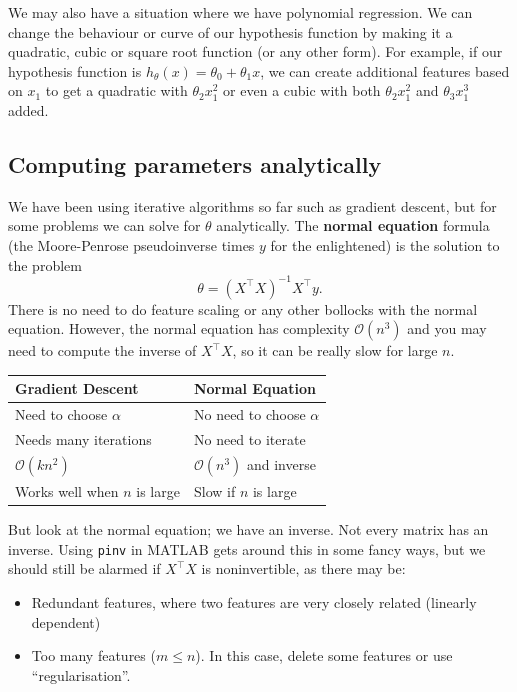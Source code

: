 \documentclass[a4paper, 12pt, oneside]{scrartcl}
\begin{document}
We may also have a situation where we have polynomial regression. We can change the behaviour or curve of our hypothesis function by making it a quadratic, cubic or square root function (or any other form). For example, if our hypothesis function is $h_\theta(x) = \theta_0 + \theta_1 x$, we can create additional features based on $x_1$ to get a quadratic with $\theta_2 x_1^2$ or even a cubic with both $\theta_2 x_1^2$ and $\theta_3 x_1^3$ added.

\subsection{Computing parameters analytically}

We have been using iterative algorithms so far such as gradient descent, but for some problems we can solve for $\theta$ analytically. The \textbf{normal equation} formula (the Moore-Penrose pseudoinverse times $y$ for the enlightened) is the solution to the problem
\[\theta = (X^\top X)^{-1} X^\top y.\]
There is no need to do feature scaling or any other bollocks with the normal equation. However, the normal equation has complexity $\mathcal O(n^3)$ and you may need to compute the inverse of $X^\top X$, so it can be really slow for large $n$.

\begin{center}
\begin{tabular}{l|l}
Gradient Descent & Normal Equation \\
\hline
Need to choose $\alpha$ & No need to choose $\alpha$ \\
Needs many iterations & No need to iterate \\
$\mathcal O(kn^2)$ & $\mathcal O(n^3)$ and inverse \\
Works well when $n$ is large & Slow if $n$ is large
\end{tabular}
\end{center}

But look at the normal equation; we have an inverse. Not every matrix has an inverse. Using \texttt{pinv} in MATLAB gets around this in some fancy ways, but we should still be alarmed if $X^\top X$ is noninvertible, as there may be:
\begin{itemize}
    \item Redundant features, where two features are very closely related (linearly dependent)
    \item Too many features ($m \leq n$). In this case, delete some features or use ``regularisation''.
\end{itemize}
\end{document}
